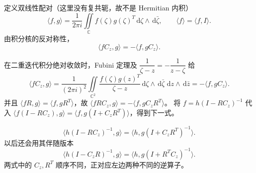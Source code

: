 \documentclass[lang=cn,scheme=chinese,mode=simple,device=normal,color=blue,math=cm,thmcnt=section,12pt]{elegantbook}
\newcommand{\dd}{\,\mathrm{d}}
\newcommand{\eqq}[2]{\tag{#1}\label{eq:#1}#2}
\begin{document}
定义双线性配对（这里没有复共轭，故不是 Hermitian 内积）
\[
\langle f,g\rangle=\dfrac{1}{2\pi i}\iint\limits_{\mathbb C}f(\zeta)g(\zeta)^T\dd\zeta\wedge\dd\bar\zeta,
\qquad \langle f\rangle=\langle f,I\rangle.
\]
由积分核的反对称性，
\begin{equation}
\eqq{7.2.4}{\langle fC_z,g\rangle=-\langle f,gC_z\rangle.}
\end{equation}
\begin{callout}[计算：配对、转置与逆算子的实际次序]
在二重迭代积分绝对收敛时，Fubini 定理及 $\dfrac{1}{\zeta-z}=-\dfrac{1}{z-\zeta}$ 给
\[
\langle fC_z,g\rangle=\dfrac{1}{(2\pi i)^2}\iint\limits_{\mathbb C^2}
\dfrac{f(\zeta)g(z)^T}{\zeta-z}\dd\zeta\wedge\dd\bar\zeta\,\dd z\wedge\dd\bar z
=-\langle f,gC_z\rangle.
\]
并且 $\langle fR,g\rangle=\langle f,gR^T\rangle$，故
$\langle fRC_z,g\rangle=-\langle f,gC_zR^T\rangle$。
将 $f=h(I-RC_z)^{-1}$ 代入 $\langle f(I-RC_z),g\rangle=\langle f,g(I+C_zR^T)\rangle$，得到下一式。
\end{callout}
\begin{equation}
\eqq{7.2.5}{\langle h(I-RC_z)^{-1},g\rangle=\langle h,g(I+C_zR^T)^{-1}\rangle.}
\end{equation}
以后还会用其伴随版本
\[
\langle h(I-C_zR)^{-1},g\rangle=\langle h,g(I+R^TC_z)^{-1}\rangle.
\]
两式中的 $C_z,R^T$ 顺序不同，正对应左边两种不同的逆算子。
\end{document}
